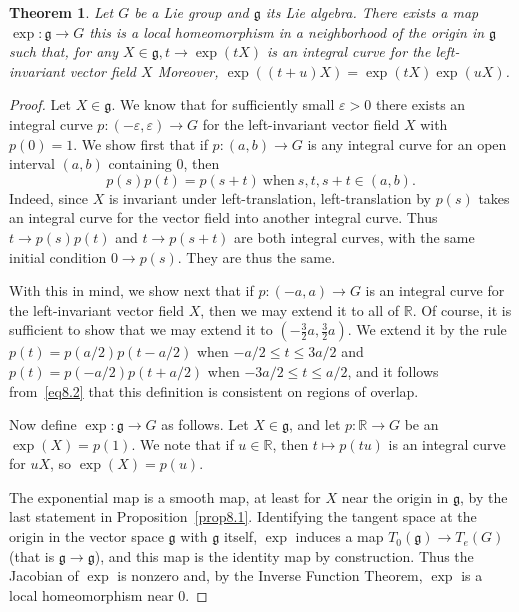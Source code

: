 \documentclass[12pt,reqno]{book}%
\newtheorem{theorem}{Theorem}[chapter]
\theoremstyle{definition}
\theoremstyle{remark}
\theoremstyle{theorem}
\theoremstyle{remark}
\begin{document}
\begin{theorem}\label{thm8.1}%
    Let $G$ be a Lie group and $\mathfrak{g}$ its Lie algebra.
    There exists a map $\exp : \mathfrak{g} \to G$ this is a local homeomorphism in a neighborhood of the origin in $\mathfrak{g}$ such that, for any $X \in \mathfrak{g}, t \to \exp(tX)$ is an integral curve for the left-invariant vector field $X$
    Moreover, $\exp((t + u)X) = \exp(tX) \exp(uX)$.
\end{theorem}%
\begin{proof}%
    Let $X \in \mathfrak{g}$.
    We know that for sufficiently small $\varepsilon > 0$ there exists an integral curve $p : (-\varepsilon, \varepsilon) \to G$ for the left-invariant vector field $X$ with $p(0) = 1$.
    We show first that if $p : (a, b) \to G$ is any integral curve for an open interval $(a, b)$ containing 0, then
    \begin{equation}\label{eq8.2}
        p(s)p(t) = p(s + t) \ \text{when} \ s, t, s+t \in (a, b).
    \end{equation}
    Indeed, since $X$ is invariant under left-translation, left-translation by $p(s)$ takes an integral curve for the vector field into another integral curve.
    Thus $t \to p(s)p(t)$ and $t \to p(s + t)$ are both integral curves, with the same initial condition $0 \to p(s)$.
    They are thus the same.

    With this in mind, we show next that if $p : (-a, a) \to G$ is an integral curve for the left-invariant vector field $X$, then we may extend it to all of $\mathbb{R}$.
    Of course, it is sufficient to show that we may extend it to ${\left(-\frac{3}{2}a, \frac{3}{2}a\right)}$.
    We extend it by the rule $p(t) = p(a/2) p(t - a/2)$ when $-a/2 \leq t \leq 3a/2$ and $p(t) = p(-a/2) p(t + a/2)$ when $-3a/2 \leq t \leq a/2$, and it follows from~\eqref{eq8.2} that this definition is consistent on regions of overlap.

    Now define $\exp : \mathfrak{g} \to G$ as follows.
    Let $X \in \mathfrak{g}$, and let $p : \mathbb{R} \to G$ be an $\exp(X) = p(1)$.
    We note that if $u \in \mathbb{R}$, then $t \mapsto p(tu)$ is an integral curve for $uX$, so $\exp(X) = p(u)$.

    The exponential map is a smooth map, at least for $X$ near the origin in $\mathfrak{g}$, by the last statement in Proposition~\ref{prop8.1}.
    Identifying the tangent space at the origin in the vector space $\mathfrak{g}$ with $\mathfrak{g}$ itself, $\exp$ induces a map $T_0(\mathfrak{g}) \to T_e(G)$ (that is $\mathfrak{g} \to \mathfrak{g}$), and this map is the identity map by construction.
    Thus the Jacobian of $\exp$ is nonzero and, by the Inverse Function Theorem, $\exp$ is a local homeomorphism near 0.
\end{proof}%
\end{document}
